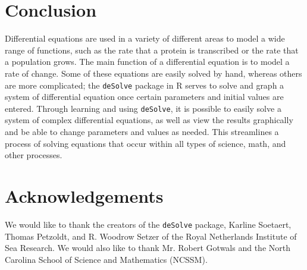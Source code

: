 \section{Conclusion}

Differential equations are used in a variety of different areas to model a wide range of functions, such as the rate that a protein is transcribed or the rate that a population grows.
The main function of a differential equation is to model a rate of change.
Some of these equations are easily solved by hand, whereas others are more complicated;
the \texttt{deSolve} package in R serves to solve and graph a system of differential equation once certain parameters and initial values are entered.
Through learning and using \texttt{deSolve}, it is possible to easily solve a system of complex differential equations, as well as view the results graphically and be able to change parameters and values as needed.
This streamlines a process of solving equations that occur within all types of science, math, and other processes.

\section{Acknowledgements}

We would like to thank the creators of the \texttt{deSolve} package, Karline Soetaert, Thomas Petzoldt, and R.
Woodrow Setzer of the Royal Netherlands Institute of Sea Research.
We would also like to thank Mr. Robert Gotwals and the North Carolina School of Science and Mathematics (NCSSM).
